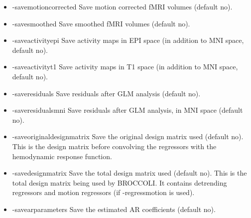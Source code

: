 \begin{itemize}
\item -savemotioncorrected       
\newline \newline Save motion corrected fMRI volumes (default no). 

\item -savesmoothed              
\newline \newline Save smoothed fMRI volumes (default no). 

\item -saveactivityepi           
\newline \newline Save activity maps in EPI space \newline (in addition to MNI space, default no). 

\item -saveactivityt1            
\newline \newline Save activity maps in T1 space \newline (in addition to MNI space, default no). 

\item -saveresiduals             
\newline \newline Save residuals after GLM analysis (default no). 

\item -saveresidualsmni          
\newline \newline Save residuals after GLM analysis, in MNI space (default no). 

\item -saveoriginaldesignmatrix  
\newline \newline Save the original design matrix used (default no). This is the design matrix before convolving the regressors with the hemodynamic response function.

\item -savedesignmatrix          
\newline \newline Save the total design matrix used (default no). This is the total design matrix being used by BROCCOLI. It contains detrending regressors and motion regressors (if -regressmotion is used).

\item -savearparameters          
\newline \newline Save the estimated AR coefficients (default no). 


\end{itemize}
